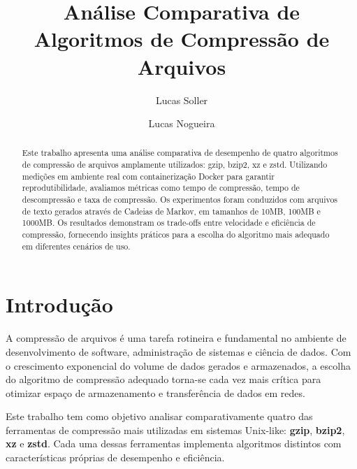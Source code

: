 \documentclass[acmsmall]{acmart}
\begin{document}
\title{Análise Comparativa de Algoritmos de Compressão de Arquivos}

\author{Lucas Soller}

\author{Lucas Nogueira}

\renewcommand{\shortauthors}{Soller \& Nogueira}

\begin{abstract}
Este trabalho apresenta uma análise comparativa de desempenho de quatro algoritmos de compressão de arquivos amplamente utilizados: gzip, bzip2, xz e zstd. Utilizando medições em ambiente real com containerização Docker para garantir reprodutibilidade, avaliamos métricas como tempo de compressão, tempo de descompressão e taxa de compressão. Os experimentos foram conduzidos com arquivos de texto gerados através de Cadeias de Markov, em tamanhos de 10MB, 100MB e 1000MB. Os resultados demonstram os trade-offs entre velocidade e eficiência de compressão, fornecendo insights práticos para a escolha do algoritmo mais adequado em diferentes cenários de uso.
\end{abstract}


\maketitle

\section{Introdução}

A compressão de arquivos é uma tarefa rotineira e fundamental no ambiente de desenvolvimento de software, administração de sistemas e ciência de dados. Com o crescimento exponencial do volume de dados gerados e armazenados, a escolha do algoritmo de compressão adequado torna-se cada vez mais crítica para otimizar espaço de armazenamento e transferência de dados em redes.

Este trabalho tem como objetivo analisar comparativamente quatro das ferramentas de compressão mais utilizadas em sistemas Unix-like: \textbf{gzip}, \textbf{bzip2}, \textbf{xz} e \textbf{zstd}. Cada uma dessas ferramentas implementa algoritmos distintos com características próprias de desempenho e eficiência.
\end{document}
